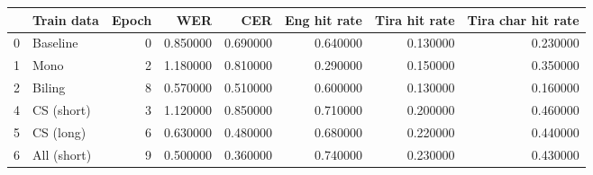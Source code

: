 \begin{tabular}{llrrrrrr}
\toprule
 & Train data & Epoch & WER & CER & Eng hit rate & Tira hit rate & Tira char hit rate \\
\midrule
0 & Baseline & 0 & 0.850000 & 0.690000 & 0.640000 & 0.130000 & 0.230000 \\
1 & Mono & 2 & 1.180000 & 0.810000 & 0.290000 & 0.150000 & 0.350000 \\
2 & Biling & 8 & 0.570000 & 0.510000 & 0.600000 & 0.130000 & 0.160000 \\
4 & CS (short) & 3 & 1.120000 & 0.850000 & 0.710000 & 0.200000 & 0.460000 \\
5 & CS (long) & 6 & 0.630000 & 0.480000 & 0.680000 & 0.220000 & 0.440000 \\
6 & All (short) & 9 & 0.500000 & 0.360000 & 0.740000 & 0.230000 & 0.430000 \\
\bottomrule
\end{tabular}
